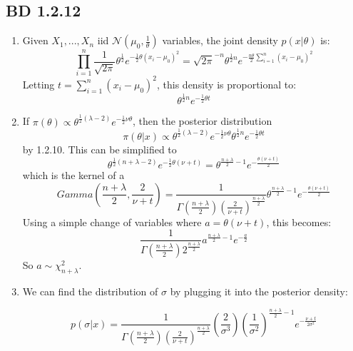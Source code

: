 \documentclass[a4paper,12pt]{article}
\begin{document}
\subsection{BD 1.2.12}
\begin{enumerate}
  \item Given $X_1,...,X_n$ iid $\mathcal{N}(\mu_0,\frac{1}{\theta})$ variables, the joint density $p(x|\theta)$ is:
  $$\prod_{i=1}^n \frac{1}{\sqrt{2\pi}}\theta^{\frac{1}{2}}e^{-\frac{1}{2}\theta(x_i-\mu_0)^2}=\sqrt{2\pi}^{-n} \theta^{\frac{1}{2}n}e^{-\frac{n\theta}{2}\sum_{i=1}^n(x_i-\mu_0)^2}$$
  Letting $t=\sum_{i=1}^n (x_i-\mu_0)^2$, this density is proportional to:$$\theta^{\frac{1}{2}n}e^{-\frac{1}{2}\theta t}$$
  \item If $\pi(\theta)\propto\theta^{\frac{1}{2}(\lambda-2)}e^{-\frac{1}{2}\nu\theta}$, then the posterior distribution $$\pi(\theta|x)\propto\theta^{\frac{1}{2}(\lambda-2)}e^{-\frac{1}{2}\nu\theta} \theta^{\frac{1}{2}n}e^{-\frac{1}{2}\theta t}$$ by 1.2.10. This can be simplified to
  $$\theta^{\frac{1}{2}(n+\lambda-2)}e^{-\frac{1}{2}\theta(\nu+t)}=\theta^{\frac{n+\lambda}{2}-1}e^{-\frac{\theta(\nu+t)}{2}}$$
  which is the kernel of a $$Gamma(\frac{n+\lambda}{2},\frac{2}{\nu+t})=\frac{1}{\Gamma(\frac{n+\lambda}{2})(\frac{2}{\nu+t})^{\frac{n+\lambda}{2}}}\theta^{\frac{n+\lambda}{2}-1}e^{-\frac{\theta(\nu+t)}{2}}$$
  Using a simple change of variables where $a=\theta(\nu+t)$, this becomes:$$\frac{1}{\Gamma(\frac{n+\lambda}{2})2^{\frac{n+\lambda}{2}}}a^{\frac{n+\lambda}{2}-1}e^{-\frac{a}{2}}$$ So $a\sim\chi_{n+\lambda}^2$.
  \item We can find the distribution of $\sigma$ by plugging it into the posterior density:

  $$p(\sigma|x)=\frac{1}{\Gamma(\frac{n+\lambda}{2})(\frac{2}{\nu+t})^{\frac{n+\lambda}{2}}}(\frac{2}{\sigma^3})(\frac{1}{\sigma^2})^{\frac{n+\lambda}{2}-1}e^{-\frac{\nu+t}{2\sigma^2}}$$
\end{enumerate}
\end{document}
